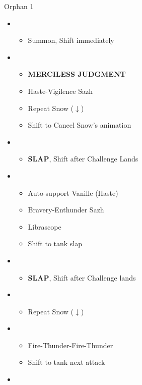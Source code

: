 \begin{battle}[3:00]{Orphan 1}
		\begin{itemize}
			\item \second
			      \begin{itemize}
				      \item Summon, Shift immediately
			      \end{itemize}
			\item \first
			      \begin{itemize}
				      \item \textbf{MERCILESS JUDGMENT}
				      \item Haste-Vigilence Sazh
				      \item Repeat Snow ($\downarrow$)
				      \item Shift to Cancel Snow's animation
			      \end{itemize}
			\item \third
			      \begin{itemize}
				      \item \textbf{SLAP}, Shift after Challenge Lands
			      \end{itemize}
			\item \first
			      \begin{itemize}
				      \item Auto-support Vanille (Haste)
				      \item Bravery-Enthunder Sazh
				      \item Librascope
				      \item Shift to tank slap
			      \end{itemize}
			\item \third
			      \begin{itemize}
				      \item \textbf{SLAP}, Shift after Challenge lands
			      \end{itemize}
			\item \first
			      \begin{itemize}
				      \item Repeat Snow ($\downarrow$)
			      \end{itemize}
			\item \fifth
			      \begin{itemize}
				      \item Fire-Thunder-Fire-Thunder
				      \item Shift to tank next attack
			      \end{itemize}
			\item \third

\end{itemize}
\end{battle}
